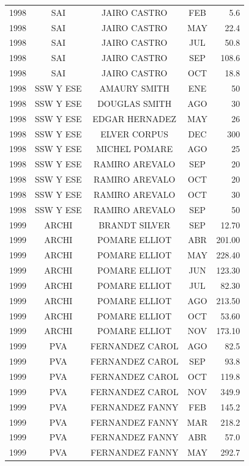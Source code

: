 \documentclass[12pt,]{article}
\begin{document}
\begin{table}[ht]
{\begin{tabular}{lcccr}
  1998 & SAI & JAIRO CASTRO & FEB & 5.6 \\ 
  1998 & SAI & JAIRO CASTRO & MAY & 22.4 \\ 
  1998 & SAI & JAIRO CASTRO & JUL & 50.8 \\ 
  1998 & SAI & JAIRO CASTRO & SEP & 108.6 \\ 
  1998 & SAI & JAIRO CASTRO & OCT & 18.8 \\ 
  1998 & SSW Y ESE & AMAURY SMITH & ENE & 50 \\ 
  1998 & SSW Y ESE & DOUGLAS SMITH & AGO & 30 \\ 
  1998 & SSW Y ESE & EDGAR HERNADEZ & MAY & 26 \\ 
  1998 & SSW Y ESE & ELVER CORPUS & DEC & 300 \\ 
  1998 & SSW Y ESE & MICHEL POMARE & AGO & 25 \\ 
  1998 & SSW Y ESE & RAMIRO AREVALO & SEP & 20 \\ 
  1998 & SSW Y ESE & RAMIRO AREVALO & OCT & 20 \\ 
  1998 & SSW Y ESE & RAMIRO AREVALO & OCT & 30 \\ 
  1998 & SSW Y ESE & RAMIRO AREVALO & SEP & 50 \\ 
  1999 & ARCHI & BRANDT SILVER & SEP & 12.70 \\ 
  1999 & ARCHI & POMARE ELLIOT & ABR & 201.00 \\ 
  1999 & ARCHI & POMARE ELLIOT & MAY & 228.40 \\ 
  1999 & ARCHI & POMARE ELLIOT & JUN & 123.30 \\ 
  1999 & ARCHI & POMARE ELLIOT & JUL & 82.30 \\ 
  1999 & ARCHI & POMARE ELLIOT & AGO & 213.50 \\ 
  1999 & ARCHI & POMARE ELLIOT & OCT & 53.60 \\ 
  1999 & ARCHI & POMARE ELLIOT & NOV & 173.10 \\ 
  1999 & PVA & FERNANDEZ CAROL & AGO & 82.5 \\ 
  1999 & PVA & FERNANDEZ CAROL & SEP & 93.8 \\ 
  1999 & PVA & FERNANDEZ CAROL & OCT & 119.8 \\ 
  1999 & PVA & FERNANDEZ CAROL & NOV & 349.9 \\ 
  1999 & PVA & FERNANDEZ FANNY & FEB & 145.2 \\ 
  1999 & PVA & FERNANDEZ FANNY & MAR & 218.2 \\ 
  1999 & PVA & FERNANDEZ FANNY & ABR & 57.0 \\ 
  1999 & PVA & FERNANDEZ FANNY & MAY & 292.7 \\ 

\end{tabular}}
\end{table}
\end{document}
